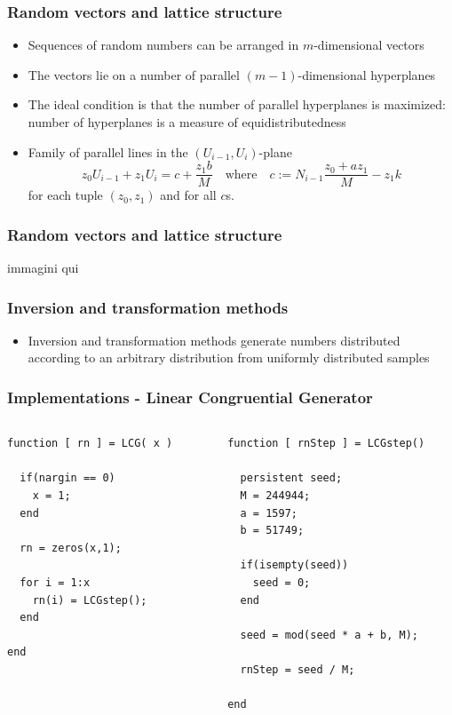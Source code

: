 \documentclass[10pt, compress]{beamer}
\begin{document}
\begin{frame}[fragile]
  \frametitle{Random vectors and lattice structure}
  \begin{itemize}
  	\item Sequences of random numbers can be arranged in $m$-dimensional vectors
  	\item The vectors lie on a number of parallel $(m-1)$-dimensional hyperplanes
  	\item The ideal condition is that the number of parallel hyperplanes is maximized:
  	  number of hyperplanes is a measure of equidistributedness
  	\item Family of parallel lines in the $(U_{i-1},U_i)$-plane \[
  		z_0 U_{i-1} +z_1 U_i = c + \frac{z_1 b}{M} \quad \text{where} \quad c := N_{i-1}\frac{z_0 + az_1}{M} - z_1 k
  	  \] for each tuple $(z_0,z_1)$ and for all $c$s.
  \end{itemize}
\end{frame}

\begin{frame}[fragile]
  \frametitle{Random vectors and lattice structure}
  immagini qui
\end{frame}

\begin{frame}[fragile]
  \frametitle{Inversion and transformation methods}
  \begin{itemize}
  	\item Inversion and transformation methods generate numbers distributed according to
  	  an arbitrary distribution from uniformly distributed samples
  \end{itemize}
\end{frame}

\begin{frame}[fragile]
	\frametitle{Implementations - Linear Congruential Generator}
	\begin{columns}[t]
		\begin{column}{5cm}
	
			\begin{verbatim}
function [ rn ] = LCG( x ) 

  if(nargin == 0)
    x = 1;
  end
  
  rn = zeros(x,1);
  
  for i = 1:x
    rn(i) = LCGstep();
  end

end
			\end{verbatim}
		\end{column}
		\begin{column}{5cm}
			\begin{verbatim}
function [ rnStep ] = LCGstep()

  persistent seed;
  M = 244944;
  a = 1597;
  b = 51749;
  
  if(isempty(seed))
    seed = 0;
  end
  
  seed = mod(seed * a + b, M);
  
  rnStep = seed / M;

end
			\end{verbatim}
		\end{column}
	\end{columns}
\end{frame}
\end{document}
